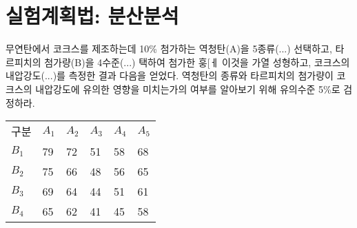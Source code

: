 \section{실험계획법: 분산분석}
무연탄에서 코크스를 제조하는데 10\% 첨가하는 역청탄(A)을
5종류(...) 선택하고, 타르피치의 첨가량(B)을 4수준(...)
택하여 첨가한 훙[ㅔ 이것을 가열 성형하고, 코크스의 내압강도(...)를
측정한 결과 다음을 얻었다. 역청탄의 종류와 타르피치의 첨가량이
코크스의 내압강도에 유의한 영향을 미치는가의 여부를 알아보기 위해
유의수준 5\%로 검정하라.

\begin{tabularx}{0.9\textwidth}{ X|X|X|X|X|X }
  구분 & $A_1$ & $A_2$ & $A_3$ & $A_4$ & $A_5$ \\
  \noalign{\smallskip}\hline\noalign{\smallskip}
  $B_1$ & 79 & 72 & 51 & 58 & 68 \\
  $B_2$ & 75 & 66 & 48 & 56 & 65 \\
  $B_3$ & 69 & 64 & 44 & 51 & 61 \\
  $B_4$ & 65 & 62 & 41 & 45 & 58
\end{tabularx}

